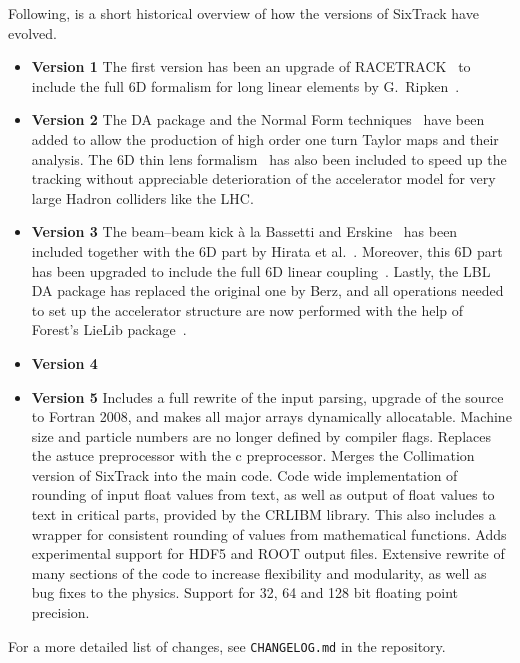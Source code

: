 Following, is a short historical overview of how the versions of SixTrack have evolved.
\begin{itemize}
    \item \textbf{Version 1}
        The first version has been an upgrade of RACETRACK~\cite{RACETRACK} to include the full 6D formalism for long linear elements by G.~Ripken~\cite{Ripken85}.
    \item \textbf{Version 2}
        The DA package and the Normal Form techniques~\cite{Berz89,Forest89} have been added to allow the production of high order one turn Taylor maps and their analysis.
        The 6D thin lens formalism~\cite{Ripken95} has also been included to speed up the tracking without appreciable deterioration of the accelerator model for very large Hadron colliders like the LHC.
    \item \textbf{Version 3}
        The beam--beam kick \`a la Bassetti and Erskine~\cite{BasErs} has been included together with the 6D part by Hirata et al.~\cite{Hirata}.
        Moreover, this 6D part has been upgraded to include the full 6D linear coupling~\cite{ripbeam}.
        Lastly, the LBL DA package has replaced the original one by Berz, and all operations needed to set up the accelerator structure are now performed with the help of Forest's LieLib package~\cite{DALIE}.
    \item \textbf{Version 4}
    \item \textbf{Version 5}
        Includes a full rewrite of the input parsing, upgrade of the source to Fortran 2008, and makes all major arrays dynamically allocatable.
        Machine size and particle numbers are no longer defined by compiler flags.
        Replaces the astuce preprocessor with the c preprocessor.
        Merges the Collimation version of SixTrack into the main code.
        Code wide implementation of rounding of input float values from text, as well as output of float values to text in critical parts, provided by the CRLIBM library.
        This also includes a wrapper for consistent rounding of values from mathematical functions.
        Adds experimental support for HDF5 and ROOT output files.
        Extensive rewrite of many sections of the code to increase flexibility and modularity, as well as bug fixes to the physics.
        Support for 32, 64 and 128 bit floating point precision.
\end{itemize}

For a more detailed list of changes, see \texttt{CHANGELOG.md} in the repository.

